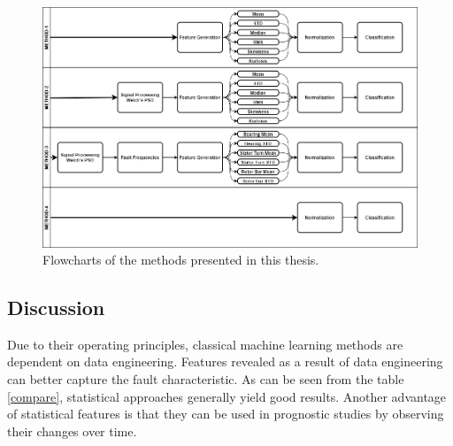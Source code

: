 \begin{landscape}
	\thispagestyle{empty} %
	\vspace*{5mm}
	\begin{figure}
		\centering
		\includegraphics[scale=.45,keepaspectratio=true]{./fig/methods.png} %
		\caption{Flowcharts of the methods presented in this thesis.}
		\label{methods}
	\end{figure}
	
	  
\end{landscape}
\subsection{Discussion}

Due to their operating principles, classical machine learning methods are dependent on data engineering. Features revealed as a result of data engineering can better capture the fault characteristic. As can be seen from the table \ref{compare}, statistical approaches generally yield good results. Another advantage of statistical features is that they can be used in prognostic studies by observing their changes over time. 

